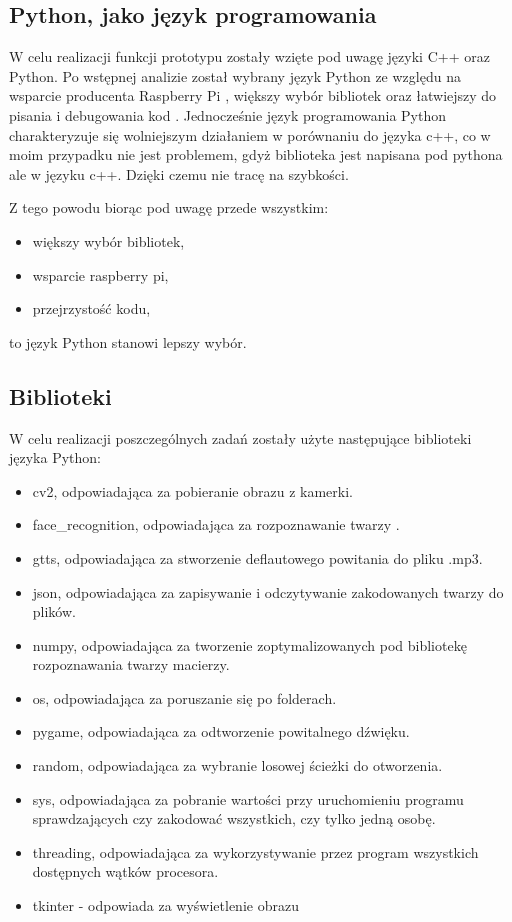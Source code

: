\documentclass[a4paper,12pt,reqno]{article}
\begin{document}
\subsection{Python, jako język programowania}
W celu realizacji funkcji prototypu zostały wzięte pod uwagę języki C++ oraz Python. Po wstępnej analizie został wybrany język Python ze względu na wsparcie producenta Raspberry Pi \cite{watki_jak_pisac}, większy wybór bibliotek \cite{face_detection_and_recognition_using_opencv} oraz łatwiejszy do pisania i debugowania kod \cite{face_recognition_with_python}. Jednocześnie język programowania Python charakteryzuje się wolniejszym działaniem w porównaniu do języka c++, co w moim przypadku nie jest problemem, gdyż biblioteka jest napisana pod pythona ale w języku c++. Dzięki czemu nie tracę na szybkości.

Z tego powodu biorąc pod uwagę przede wszystkim:
\begin{itemize}
\item większy wybór bibliotek,
\item wsparcie raspberry pi,
\item przejrzystość kodu,
\end{itemize}
to język Python stanowi lepszy wybór.
\subsection{Biblioteki}
W celu realizacji poszczególnych zadań zostały użyte następujące biblioteki języka Python:
\begin{itemize}
\item cv2, odpowiadająca za pobieranie obrazu z kamerki.
\item face\_recognition, odpowiadająca za rozpoznawanie twarzy \cite{face_recognition_github} \cite{face_recognition_implementation_on_raspberrypi} \cite{face_recognition_python}.
\item gtts, odpowiadająca za stworzenie deflautowego powitania do pliku .mp3.
\item json, odpowiadająca za zapisywanie i odczytywanie zakodowanych twarzy do plików.
\item numpy, odpowiadająca za tworzenie zoptymalizowanych pod bibliotekę rozpoznawania twarzy macierzy.
\item os, odpowiadająca za poruszanie się po folderach.
\item pygame, odpowiadająca za odtworzenie powitalnego dźwięku.
\item random, odpowiadająca za wybranie losowej ścieżki do otworzenia.
\item sys, odpowiadająca za pobranie wartości przy uruchomieniu programu sprawdzających czy zakodować wszystkich, czy tylko jedną osobę.
\item threading, odpowiadająca za wykorzystywanie przez program wszystkich dostępnych wątków procesora.
\item tkinter - odpowiada za wyświetlenie obrazu
\end{itemize}
\end{document}
